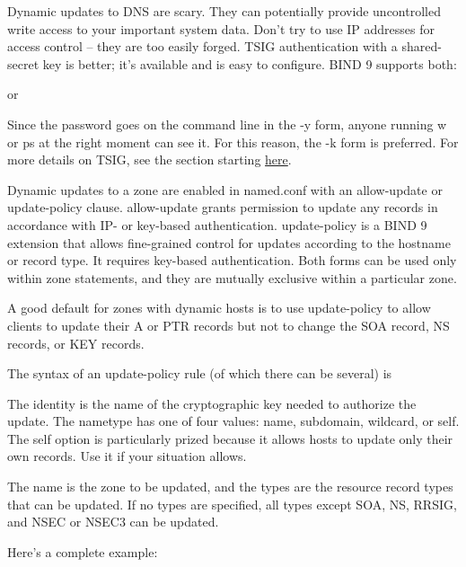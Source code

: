 
Dynamic updates to DNS are scary. They can potentially provide
uncontrolled write access to your important system data. Don't try to
use IP addresses for access control -- they are too easily forged. TSIG
authentication with a shared-secret key is better; it's available and is
easy to configure. BIND 9 supports both:


or


Since the password goes on the command line in the {-y} form, anyone
running {w} or {ps} at the right moment can see it. For this reason, the
{-k} form is preferred. For more details on TSIG, see the section
starting
\protect\hyperlink{part0024_split_057.htmlux5cux23_idTextAnchor936}{here}.

\protect\hypertarget{part0024_split_052.htmlux5cux23_idTextAnchor929}{}{}Dynamic
updates to a zone are enabled in {named.conf} with an {allow-update} or
{update-policy} clause. {allow-update} grants permission to update any
records in accordance with IP- or key-based authentication.
{update-policy} is a BIND 9 extension that allows fine-grained control
for updates according to the hostname or record type. It requires
key-based authentication. Both forms can be used only within {zone}
statements, and they are mutually exclusive within a particular {zone}.

A good default for zones with dynamic hosts is to use {update-policy} to
allow clients to update their A or PTR records but not to change the SOA
record, NS records, or KEY records.

The syntax of an {update-policy} rule (of which there can be several) is


The {identity} is the name of the cryptographic key needed to authorize
the update. The {nametype} has one of four values: {name}, {subdomain},
{wildcard}, or {self}. The {self} option is particularly prized because
it allows hosts to update only their own records. Use it if your
situation allows.

The {name} is the zone to be updated, and the {types} are the resource
record types that can be updated. If no types are specified, all types
except SOA, NS, RRSIG, and NSEC or NSEC3 can be updated.

Here's a complete
example:\protect\hypertarget{part0024_split_052.htmlux5cux23_idIndexMarker2230}{}{}

